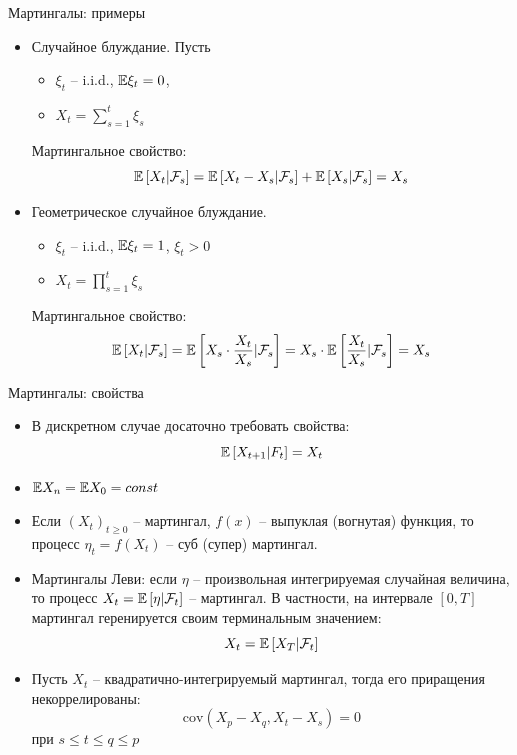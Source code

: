 \documentclass{beamer}
\begin{document}
\begin{frame}{Мартингалы: примеры}
    \begin{itemize}
        \item Случайное блуждание. Пусть
        \begin{itemize}
            \item $\xi_t$ -- i.i.d., $\mathbb{E} \xi_t =0$,
            \item $X_t = \sum_{s=1}^{t}\xi_s$
        \end{itemize}
    Мартингальное свойство:
    $$
        \mathbb{E} \left[ X_t | \mathcal{F}_s\right]
        = \mathbb{E} \left[ X_t - X_s | \mathcal{F}_s\right]
        + \mathbb{E} \left[ X_s | \mathcal{F}_s\right] = X_s
    $$
    \item Геометрическое случайное блуждание. 
    \begin{itemize}
        \item $\xi_t$ -- i.i.d., $\mathbb{E} \xi_t = 1$, $\xi_t > 0$
        \item $X_t = \prod_{s=1}^t \xi_s$
    \end{itemize}
    Мартингальное свойство:
    $$
        \mathbb{E} \left[ X_t | \mathcal{F}_s\right]
        = \mathbb{E} \left[ X_s \cdot \dfrac{X_t}{X_s} | \mathcal{F}_s\right]
        = X_s \cdot \mathbb{E} \left[ \dfrac{X_t}{X_s} | \mathcal{F}_s\right] = X_s
    $$
    \end{itemize}
\end{frame}

\begin{frame}{Мартингалы: свойства}
    \begin{itemize}
        \item В дискретном случае досаточно требовать свойства:
        $$
            \mathbb{E} \left[ X_{t+1} | F_{t}\right] = X_t
        $$
        \item $\mathbb{E} X_n = \mathbb{E} X_0 = const$
        \item Если $(X_t)_{t\geq 0}$ -- мартингал, $f(x)$ -- выпуклая (вогнутая) функция, то процесс $\eta_t = f(X_t)$ -- суб (супер) мартингал.
        \item Мартингалы Леви: если $\eta$ -- произвольная интегрируемая случайная величина, то процесс $X_t = \mathbb{E} \left[ \eta|\mathcal{F}_t\right]$ -- мартингал. В частности, на интервале $[0, T]$ мартингал геренируется своим терминальным значением:
        $$
            X_t = \mathbb{E} \left[ X_T | \mathcal{F}_t \right]
        $$
        \item Пусть $X_t$ -- квадратично-интегрируемый мартингал, тогда его приращения некоррелированы:
        $$
            \mathrm{cov} (X_p - X_q, X_t - X_s) = 0
        $$ при $s \leq t \leq q \leq p$
    \end{itemize} 
\end{frame}
\end{document}
